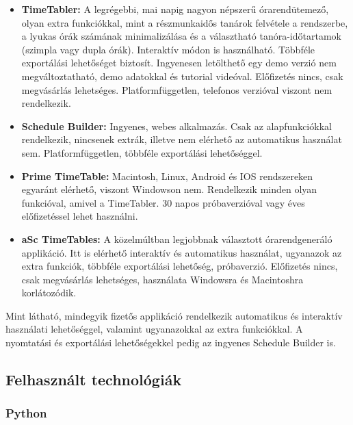 \documentclass[12pt,a4paper]{report}
\begin{document}
\begin{itemize}
    \item \textbf{TimeTabler:} A legrégebbi, mai napig nagyon népszerű órarendütemező, olyan extra funkciókkal,
             mint a részmunkaidős tanárok felvétele a rendszerbe, a lyukas órák számának minimalizálása és a választható
             tanóra-időtartamok (szimpla vagy dupla órák). Interaktív módon is használható. Többféle exportálási lehetőséget biztosít.
             Ingyenesen letölthető egy demo verzió nem megváltoztatható, demo adatokkal és 
             tutorial videóval. Előfizetés nincs, csak megvásárlás lehetséges. 
             Platformfüggetlen, telefonos verzióval viszont nem rendelkezik.
    \item \textbf{Schedule Builder:} Ingyenes, webes alkalmazás. Csak az alapfunkciókkal rendelkezik,
                   nincsenek extrák, illetve nem elérhető az automatikus használat sem.
                   Platformfüggetlen, többféle exportálási lehetőséggel.
    \item \textbf{Prime TimeTable:} Macintosh, Linux, Android és IOS rendszereken egyaránt elérhető, viszont
                  Windowson nem. Rendelkezik minden olyan funkcióval, amivel a TimeTabler. 30 napos próbaverzióval vagy éves
                  előfizetéssel lehet használni.
    \item \textbf{aSc TimeTables:} A közelmúltban legjobbnak választott órarendgeneráló applikáció. Itt is elérhető interaktív és
                 automatikus használat, ugyanazok az extra funkciók, többféle exportálási lehetőség, próbaverzió. Előfizetés nincs, csak
                 megvásárlás lehetséges, használata Windowsra és Macintoshra korlátozódik.
\end{itemize}

Mint látható, mindegyik fizetős applikáció rendelkezik automatikus és interaktív használati
lehetőséggel, valamint ugyanazokkal az extra funkciókkal. A nyomtatási és exportálási lehetőségekkel
pedig az ingyenes Schedule Builder is. 

\subsection{Felhasznált technológiák}

\subsubsection{Python}
\end{document}
